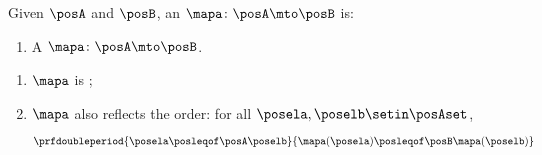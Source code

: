 \begin{ctdefinition}
    \label{def:order-isomorphism}
    Given  $\posA$ and $\posB$, an  $\mapa \colon \posA \mto \posB$ is:

    \constit
    \begin{enumerate}
        \item A  $\mapa \colon \posA \mto \posB$.
    \end{enumerate}

    \condit
    \begin{enumerate}
        \item $\mapa$ is ;
        \item $\mapa$ also reflects the order: for all $\posela, \poselb \setin \posAset$,
              \begin{equation}
                  \prfdoubleperiod{
                      \posela \posleqof\posA \poselb
                  }{
                      \mapa(\posela) \posleqof\posB \mapa(\poselb)
                  }
              \end{equation}
    \end{enumerate}
\end{ctdefinition}


